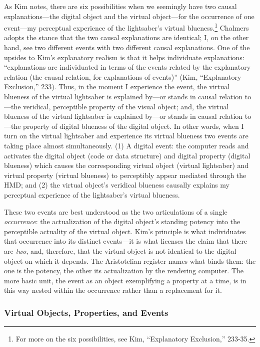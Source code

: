 \documentclass{article}
\begin{document}
As Kim notes, there are six possibilities when we seemingly have two causal explanations—the digital object and the virtual object—for the occurrence of one event—my perceptual experience of the lightsaber’s virtual blueness.\footnote{For more on the six possibilities, see Kim, ``Explanatory Exclusion,'' 233-35.} Chalmers adopts the stance that the two causal explanations are identical; I, on the other hand, see two different events with two different causal explanations. One of the upsides to Kim’s explanatory realism is that it helps individuate explanations: ``explanations are individuated in terms of the events related by the explanatory relation (the causal relation, for explanations of events)'' (Kim, ``Explanatory Exclusion,'' 233). Thus, in the moment I experience the event, the virtual blueness of the virtual lightsaber is explained by—or stands in causal relation to—the veridical, perceptible property of the visual object; and, the virtual blueness of the virtual lightsaber is explained by—or stands in causal relation to—the property of digital blueness of the digital object. In other words, when I turn on the virtual lightsaber and experience its virtual blueness two events are taking place almost simultaneously. (1) A digital event: the computer reads and activates the digital object (code or data structure) and digital property (digital blueness) which causes the corresponding virtual object (virtual lightsaber) and virtual property (virtual blueness) to perceptibly appear mediated through the HMD; and (2) the virtual object’s veridical blueness causally explains my perceptual experience of the lightsaber’s virtual blueness.

These two events are best understood as the two articulations of a single \textit{occurrence}: the actualization of the digital object's standing potency into the perceptible actuality of the virtual object. Kim's principle is what individuates that occurrence into its distinct events—it is what licenses the claim that there are \textit{two}, and, therefore, that the virtual object is not identical to the digital object on which it depends. The Aristotelian register names what binds them: the one is the potency, the other its actualization by the rendering computer. The more basic unit, the event as an object exemplifying a property at a time, is in this way nested within the occurrence rather than a replacement for it.

\subsubsection*{Virtual Objects, Properties, and Events}
\end{document}
